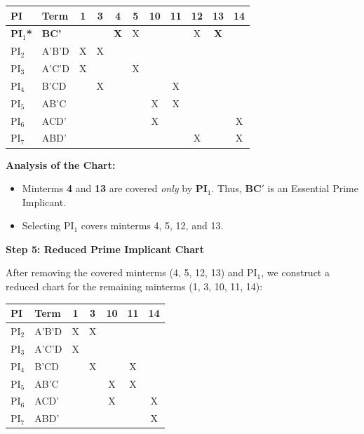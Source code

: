 \documentclass[12pt,a3paper]{article}
\begin{document}
\begin{enumerate}
\begin{tcolorbox}[enhanced,breakable,ansbox,colback=cC!4,colframe=cC,boxrule=0.8pt,arc=5pt,title={\textbf{Answer}},fonttitle=\bfseries\color{white},colbacktitle=cC]
\begin{center}
\renewcommand{\arraystretch}{1.2}
\begin{tabular}{llccccccccc}
\toprule
\textbf{PI} & \textbf{Term} & \textbf{1} & \textbf{3} & \textbf{4} & \textbf{5} & \textbf{10} & \textbf{11} & \textbf{12} & \textbf{13} & \textbf{14} \\
\midrule
\rowcolor{cC!10}
\textbf{PI$_1$*} & \textbf{BC'}   & & & \textbf{X} & X & & & X & \textbf{X} & \\
PI$_2$ & A'B'D  & X & X & & & & & & & \\
PI$_3$ & A'C'D  & X & & & X & & & & & \\
PI$_4$ & B'CD   & & X & & & & X & & & \\
PI$_5$ & AB'C   & & & & & X & X & & & \\
PI$_6$ & ACD'   & & & & & X & & & & X \\
PI$_7$ & ABD'   & & & & & & & X & & X \\
\bottomrule
\end{tabular}
\end{center}

\vspace{0.5em}
\textbf{Analysis of the Chart:}
\begin{itemize}
    \item Minterms \textbf{4} and \textbf{13} are covered \textit{only} by \textbf{PI$_1$}. Thus, \textcolor{cC}{$\mathbf{BC'}$ is an Essential Prime Implicant}.
    \item Selecting PI$_1$ covers minterms 4, 5, 12, and 13.
\end{itemize}

\vspace{1em}
\textbf{Step 5: Reduced Prime Implicant Chart}

After removing the covered minterms (4, 5, 12, 13) and PI$_1$, we construct a reduced chart for the remaining minterms (1, 3, 10, 11, 14):

\begin{center}
\renewcommand{\arraystretch}{1.2}
\begin{tabular}{llccccc}
\toprule
\textbf{PI} & \textbf{Term} & \textbf{1} & \textbf{3} & \textbf{10} & \textbf{11} & \textbf{14} \\
\midrule
PI$_2$ & A'B'D  & X & X & & & \\
PI$_3$ & A'C'D  & X & & & & \\
PI$_4$ & B'CD   & & X & & X & \\
PI$_5$ & AB'C   & & & X & X & \\
PI$_6$ & ACD'   & & & X & & X \\
PI$_7$ & ABD'   & & & & & X \\
\bottomrule
\end{tabular}
\end{center}


\end{tcolorbox}
\end{enumerate}
\end{document}
